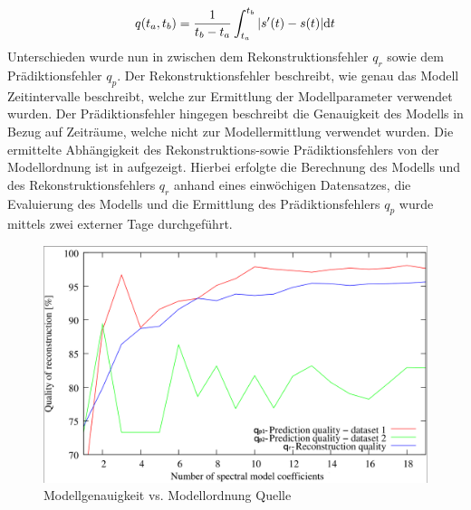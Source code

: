 \begin{equation}
	q(t_a,t_b) = \frac{1}{t_b - t_a} \int_{t_a}^{t_b} |s'(t) - s(t)| {\mathrm{d}}t
	\label{eq:Modellgenauigkeit}
\end{equation}
Unterschieden wurde nun in \cite{Krajnik.2014} zwischen dem Rekonstruktionsfehler $q_r$ sowie dem Prädiktionsfehler $q_p$. Der Rekonstruktionsfehler beschreibt, wie genau das Modell Zeitintervalle beschreibt, welche zur Ermittlung der Modellparameter verwendet wurden. Der Prädiktionsfehler hingegen beschreibt die Genauigkeit des Modells in Bezug auf Zeiträume, welche nicht zur Modellermittlung verwendet wurden. Die ermittelte Abhängigkeit des Rekonstruktions-sowie Prädiktionsfehlers von der Modellordnung ist in  aufgezeigt. Hierbei erfolgte die Berechnung des Modells und des Rekonstruktionsfehlers $q_r$ anhand eines einwöchigen Datensatzes, die Evaluierung des Modells und die Ermittlung des Prädiktionsfehlers $q_p$ wurde mittels zwei externer Tage durchgeführt.  \\
\begin{figure}[!ht]
	\begin{center}
		\includegraphics[width=0.7\linewidth]{Abbildungen/stand_der_technik/predict_reconstruct_error}
		\caption{Modellgenauigkeit vs. Modellordnung Quelle \cite{Krajnik.2014}}
		\label{fig.predict_reconstruct_error}	
	\end{center}
	
\end{figure}


